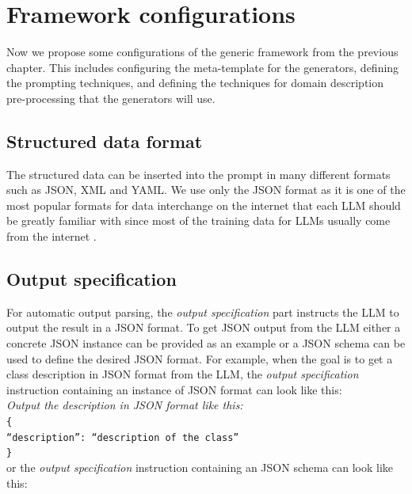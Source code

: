\chapter{Framework configurations}
\label{chap:framework_configuration}

Now we propose some configurations of the generic framework from the previous chapter. This includes configuring the meta-template for the generators, defining the prompting techniques, and defining the techniques for domain description pre-processing that the generators will use.


\section{Structured data format}

The structured data can be inserted into the prompt in many different formats such as JSON, XML and YAML. We use only the JSON format as it is one of the most popular formats for data interchange on the internet that each LLM should be greatly familiar with since most of the training data for LLMs usually come from the internet \cite{Zhao2023}.


\section{Output specification}

For automatic output parsing, the \emph{output specification} part instructs the LLM to output the result in a JSON format. To get JSON output from the LLM either a concrete JSON instance can be provided as an example or a JSON schema can be used to define the desired JSON format. For example, when the goal is to get a class description in JSON format from the LLM, the \emph{output specification} instruction containing an instance of JSON format can look like this: \\

\noindent{}\textit{Output the description in JSON format like this:} \\
\texttt{\frenchspacing\{ \\
\null \quad ``description'': ``description of the class'' \\
\}} \\

\noindent{}or the \emph{output specification} instruction containing an JSON schema can look like this: \\

